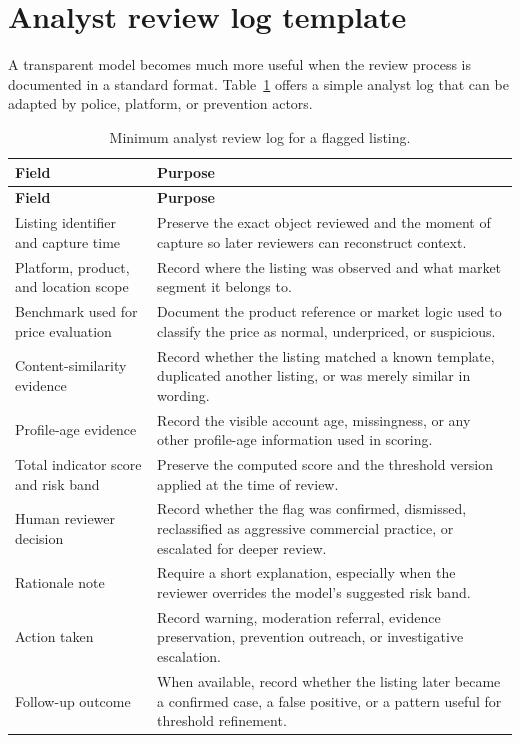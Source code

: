 \documentclass[11pt,a4paper]{article}
\begin{document}
{\newpage}

\section{Analyst review log template}
A transparent model becomes much more useful when the review process is documented in a standard format. Table~\ref{tab:logtemplate} offers a simple analyst log that can be adapted by police, platform, or prevention actors.

\begin{longtable}{p{4.0cm} p{10.6cm}}
\caption{Minimum analyst review log for a flagged listing.}\label{tab:logtemplate}\\
\toprule
\textbf{Field} & \textbf{Purpose} \\
\midrule
\endfirsthead
\toprule
\textbf{Field} & \textbf{Purpose} \\
\midrule
\endhead
Listing identifier and capture time & Preserve the exact object reviewed and the moment of capture so later reviewers can reconstruct context. \\
Platform, product, and location scope & Record where the listing was observed and what market segment it belongs to. \\
Benchmark used for price evaluation & Document the product reference or market logic used to classify the price as normal, underpriced, or suspicious. \\
Content-similarity evidence & Record whether the listing matched a known template, duplicated another listing, or was merely similar in wording. \\
Profile-age evidence & Record the visible account age, missingness, or any other profile-age information used in scoring. \\
Total indicator score and risk band & Preserve the computed score and the threshold version applied at the time of review. \\
Human reviewer decision & Record whether the flag was confirmed, dismissed, reclassified as aggressive commercial practice, or escalated for deeper review. \\
Rationale note & Require a short explanation, especially when the reviewer overrides the model's suggested risk band. \\
Action taken & Record warning, moderation referral, evidence preservation, prevention outreach, or investigative escalation. \\
Follow-up outcome & When available, record whether the listing later became a confirmed case, a false positive, or a pattern useful for threshold refinement. \\
\bottomrule
\end{longtable}
\end{document}
